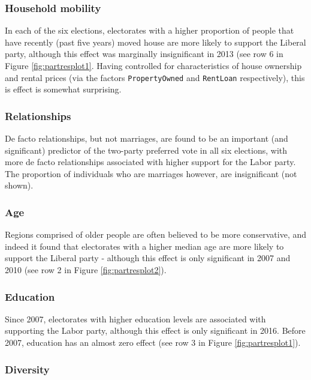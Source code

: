 \documentclass[11pt,a4paper,]{article}
\begin{document}
\hypertarget{household-mobility}{%
\subsubsection{Household mobility}\label{household-mobility}}

In each of the six elections, electorates with a higher proportion of people that have recently (past five years) moved house are more likely to support the Liberal party, although this effect was marginally insignificant in 2013 (see row 6 in Figure \ref{fig:partresplot1}. Having controlled for characteristics of house ownership and rental prices (via the factors \texttt{PropertyOwned} and \texttt{RentLoan} respectively), this is effect is somewhat surprising.

\hypertarget{relationships}{%
\subsubsection{Relationships}\label{relationships}}

De facto relationships, but not marriages, are found to be an important (and significant) predictor of the two-party preferred vote in all six elections, with more de facto relationships associated with higher support for the Labor party. The proportion of individuals who are marriages however, are insignificant (not shown).

\hypertarget{age}{%
\subsubsection{Age}\label{age}}

Regions comprised of older people are often believed to be more conservative, and indeed it found that electorates with a higher median age are more likely to support the Liberal party - although this effect is only significant in 2007 and 2010 (see row 2 in Figure \ref{fig:partresplot2}).

\hypertarget{education}{%
\subsubsection{Education}\label{education}}

Since 2007, electorates with higher education levels are associated with supporting the Labor party, although this effect is only significant in 2016. Before 2007, education has an almost zero effect (see row 3 in Figure \ref{fig:partresplot1}).

\hypertarget{diversity}{%
\subsubsection{Diversity}\label{diversity}}
\end{document}

